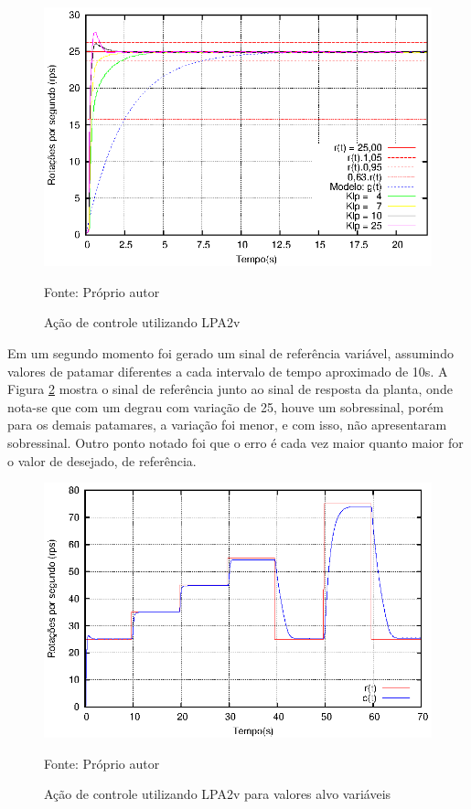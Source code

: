 \begin{figure}[!htb]
\caption{Ação de controle utilizando LPA2v}
\vspace{-1cm}\center\includegraphics[scale=1.6]{./imagens/klpAll.eps}
\label{fig:acaoLPA2v}

{\small Fonte: Próprio autor}
\end{figure}


Em um segundo momento foi gerado um sinal de referência variável,
assumindo valores de patamar diferentes a 
cada intervalo de tempo aproximado de 10s.
A Figura \ref{fig:acaoLPA2vpatam85} mostra 
o sinal de referência junto ao sinal de resposta da planta,
onde nota-se que com um degrau com variação de 25, 
houve um sobressinal, porém para os demais patamares, 
a variação foi menor, e com isso, 
não apresentaram sobressinal. 
Outro ponto notado foi que o erro é cada vez maior quanto maior for o 
valor de desejado, de referência. 



\begin{figure}[!htb]
\caption{Ação de controle utilizando LPA2v para valores alvo variáveis}
\vspace{-1cm}
\center\includegraphics[scale=1.4]{./imagens/patam85.eps}
\label{fig:acaoLPA2vpatam85}

{\small Fonte: Próprio autor}
\end{figure}



